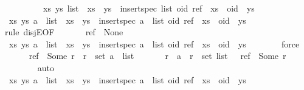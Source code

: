 \begin{isabellebody}
\ \ \ \ \ \ \ \ \ {\isasymexists}xs\ ys{\isachardot}\ list\ {\isacharequal}\ xs\ {\isacharat}\ ys\ {\isasymand}\ insert{\isacharunderscore}spec\ list\ {\isacharparenleft}oid{\isacharcomma}\ ref{\isacharparenright}\ {\isacharequal}\ xs\ {\isacharat}\ oid\ {\isacharhash}\ ys{\isachardoublequoteclose}\isanewline
\ \ \isamarkupfalse%
\ {\isachardoublequoteopen}{\isasymexists}xs\ ys{\isachardot}\ a\ {\isacharhash}\ list\ {\isacharequal}\ xs\ {\isacharat}\ ys\ {\isasymand}\ insert{\isacharunderscore}spec\ {\isacharparenleft}a\ {\isacharhash}\ list{\isacharparenright}\ {\isacharparenleft}oid{\isacharcomma}\ ref{\isacharparenright}\ {\isacharequal}\ xs\ {\isacharat}\ oid\ {\isacharhash}\ ys{\isachardoublequoteclose}\isanewline
\ \ \isamarkupfalse%
{\isacharparenleft}rule\ disjE{\isacharbrackleft}OF\ {}{\isacharbrackright}{\isacharparenright}\isanewline
\ \ \ \ \isamarkupfalse%
\ {\isachardoublequoteopen}ref\ {\isacharequal}\ None{\isachardoublequoteclose}\isanewline
\ \ \ \ \isamarkupfalse%
\ {\isachardoublequoteopen}{\isasymexists}xs\ ys{\isachardot}\ a\ {\isacharhash}\ list\ {\isacharequal}\ xs\ {\isacharat}\ ys\ {\isasymand}\ insert{\isacharunderscore}spec\ {\isacharparenleft}a\ {\isacharhash}\ list{\isacharparenright}\ {\isacharparenleft}oid{\isacharcomma}\ ref{\isacharparenright}\ {\isacharequal}\ xs\ {\isacharat}\ oid\ {\isacharhash}\ ys{\isachardoublequoteclose}\isanewline
\ \ \ \ \ \ \isamarkupfalse%
\ force\isanewline
\ \ \isamarkupfalse%
\isanewline
\ \ \ \ \isamarkupfalse%
\ {\isachardoublequoteopen}ref\ {\isacharequal}\ Some\ r\ {\isasymand}\ r\ {\isasymin}\ set\ {\isacharparenleft}a\ {\isacharhash}\ list{\isacharparenright}{\isachardoublequoteclose}\isanewline
\ \ \ \ \isamarkupfalse%
\ {}{\isacharcolon}\ {\isachardoublequoteopen}r\ {\isacharequal}\ a\ {\isasymor}\ r\ {\isasymin}\ set\ list{\isachardoublequoteclose}\ \ {}{\isacharcolon}\ {\isachardoublequoteopen}ref\ {\isacharequal}\ Some\ r{\isachardoublequoteclose}\isanewline
\ \ \ \ \ \ \isamarkupfalse%
\ auto\isanewline
\ \ \ \ \isamarkupfalse%
\ {\isachardoublequoteopen}{\isasymexists}xs\ ys{\isachardot}\ a\ {\isacharhash}\ list\ {\isacharequal}\ xs\ {\isacharat}\ ys\ {\isasymand}\ insert{\isacharunderscore}spec\ {\isacharparenleft}a\ {\isacharhash}\ list{\isacharparenright}\ {\isacharparenleft}oid{\isacharcomma}\ ref{\isacharparenright}\ {\isacharequal}\ xs\ {\isacharat}\ oid\ {\isacharhash}\ ys{\isachardoublequoteclose}\isanewline

\end{isabellebody}
